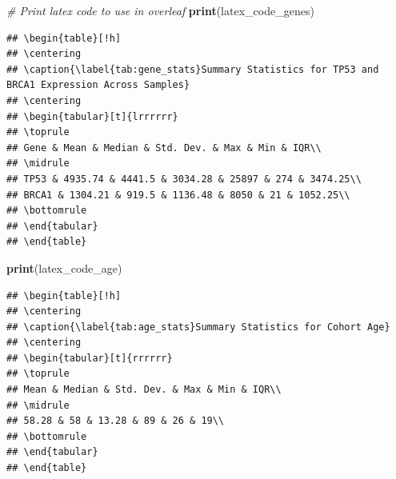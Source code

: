 \documentclass[
]{article}
\newenvironment{Shaded}{\begin{snugshade}}{\end{snugshade}}
\newcommand{\CommentTok}[1]{\textcolor[rgb]{0.56,0.35,0.01}{\textit{#1}}}
\newcommand{\FunctionTok}[1]{\textcolor[rgb]{0.13,0.29,0.53}{\textbf{#1}}}
\newcommand{\NormalTok}[1]{#1}
\begin{document}
\begin{Shaded}
\begin{Highlighting}[]
\CommentTok{\# Print latex code to use in overleaf}
\FunctionTok{print}\NormalTok{(latex\_code\_genes)}
\end{Highlighting}
\end{Shaded}

\begin{verbatim}
## \begin{table}[!h]
## \centering
## \caption{\label{tab:gene_stats}Summary Statistics for TP53 and BRCA1 Expression Across Samples}
## \centering
## \begin{tabular}[t]{lrrrrrr}
## \toprule
## Gene & Mean & Median & Std. Dev. & Max & Min & IQR\\
## \midrule
## TP53 & 4935.74 & 4441.5 & 3034.28 & 25897 & 274 & 3474.25\\
## BRCA1 & 1304.21 & 919.5 & 1136.48 & 8050 & 21 & 1052.25\\
## \bottomrule
## \end{tabular}
## \end{table}
\end{verbatim}

\begin{Shaded}
\begin{Highlighting}[]
\FunctionTok{print}\NormalTok{(latex\_code\_age)}
\end{Highlighting}
\end{Shaded}

\begin{verbatim}
## \begin{table}[!h]
## \centering
## \caption{\label{tab:age_stats}Summary Statistics for Cohort Age}
## \centering
## \begin{tabular}[t]{rrrrrr}
## \toprule
## Mean & Median & Std. Dev. & Max & Min & IQR\\
## \midrule
## 58.28 & 58 & 13.28 & 89 & 26 & 19\\
## \bottomrule
## \end{tabular}
## \end{table}
\end{verbatim}
\end{document}
